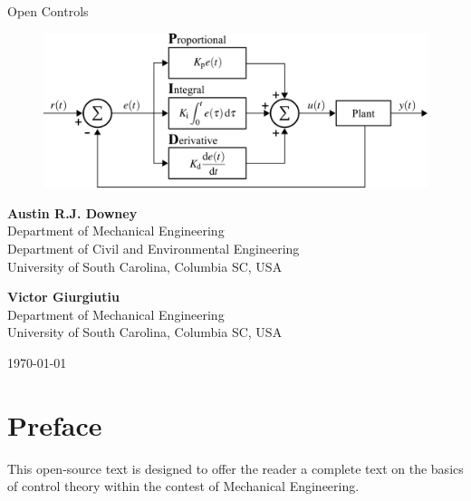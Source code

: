 \documentclass[12pt,letter]{article}
\begin{document}
\begin{center}
	{\fontsize{50}{60}\selectfont Open Controls}
	
	\vspace{3cm}
	
	\begin{figure}[H]
		\includegraphics[width=6.5in]{figures/PID_controller.png}
		\label{fig:title_figure}
	\end{figure} 
	
	\vspace{3cm}
	
	\textbf{Austin R.J. Downey}\\ Department of Mechanical Engineering \\ Department of Civil and Environmental Engineering \\ University of South Carolina, Columbia SC, USA 
	
	\vspace{1.5cm}
	
	\textbf{Victor Giurgiutiu}\\  Department of Mechanical Engineering \\ University of South Carolina, Columbia SC, USA 
	
	\vspace{1cm}
	
	\today
\end{center}

\pagebreak

\section*{Preface}

This open-source text is designed to offer the reader a complete text on the basics of control theory within the contest of Mechanical Engineering. 
\end{document}
